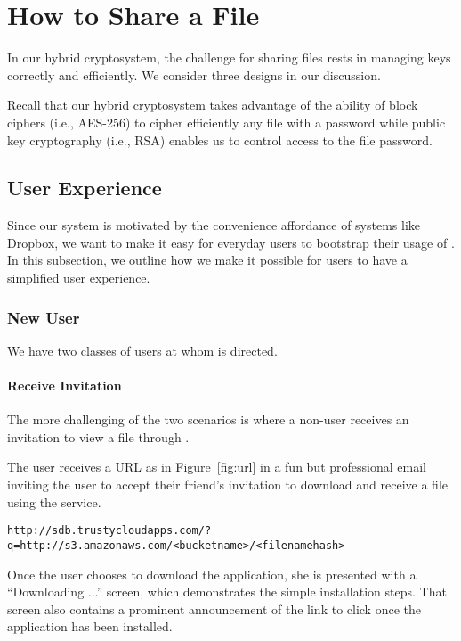 \section{How to Share a File}

In our hybrid cryptosystem, the challenge for sharing files rests in
managing keys correctly and efficiently. We consider three designs in
our discussion.

Recall that our hybrid cryptosystem takes advantage of the ability of
block ciphers (i.e., AES-256) to cipher efficiently any file with a
password while public key cryptography (i.e., RSA) enables us to
control access to the file password.

\subsection{User Experience}

Since our system is motivated by the convenience affordance of systems
like Dropbox, we want to make it easy for everyday users to bootstrap
their usage of \name. In this subsection, we outline how we make it
possible for users to have a simplified user experience.

\subsubsection*{New \name User}

We have two classes of users at whom \name is directed.

\paragraph{Receive Invitation} The more challenging of the two
scenarios is where a non-\name user receives an invitation to view a
file through \name.

The user receives a URL as in Figure~\ref{fig:url} in a fun but
professional email inviting the user to accept their friend's
invitation to download \name and receive a file using the \name
service.

\begin{figure*}
{\tt http://sdb.trustycloudapps.com/?q=http://s3.amazonaws.com/<bucketname>/<filenamehash>}
\caption{What the URL looks like.}
\label{fig:url}
\end{figure*}

Once the user chooses to download the \name application, she is
presented with a ``Downloading \name...'' screen, which demonstrates
the simple installation steps. That screen also contains a prominent
announcement of the link to click once the \name application has been
installed.

